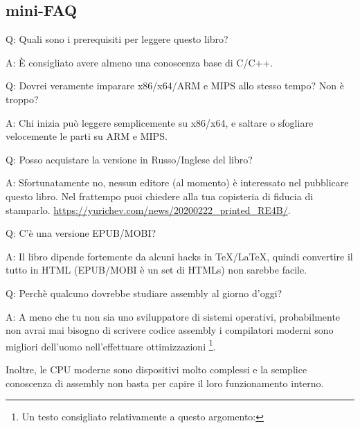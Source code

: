 \subsection*{mini-FAQ}


\par Q: Quali sono i prerequisiti per leggere questo libro?
\par A: È consigliato avere almeno una conoscenza base di C/C++.

\par Q: Dovrei veramente imparare x86/x64/ARM e MIPS allo stesso tempo? Non è troppo?
\par A: Chi inizia può leggere semplicemente su x86/x64, e saltare o sfogliare velocemente le parti su ARM e MIPS.

\par Q: Posso acquistare la versione in Russo/Inglese del libro?
\par A: Sfortunatamente no, nessun editore (al momento) è interessato nel pubblicare questo libro.
Nel frattempo puoi chiedere alla tua copisteria di fiducia di stamparlo.
\url{https://yurichev.com/news/20200222_printed_RE4B/}.

\par Q: C'è una versione EPUB/MOBI?
\par A: Il libro dipende fortemente da alcuni hacks in TeX/LaTeX, quindi convertire il tutto in HTML (EPUB/MOBI è un set di HTMLs)
non sarebbe facile.

\par Q: Perchè qualcuno dovrebbe studiare assembly al giorno d'oggi?
\par A: A meno che tu non sia uno sviluppatore di \ac{sistemi operativi}, probabilmente non avrai mai bisogno di scrivere codice assembly \textemdash{}i compilatori moderni sono migliori dell'uomo nell'effettuare ottimizzazioni \footnote{Un testo consigliato relativamente a questo argomento: \InSqBrackets{\AgnerFog}}.

Inoltre, le \ac{CPU} moderne sono dispositivi molto complessi e la semplice conoscenza di assembly non basta per capire il loro funzionamento interno.

